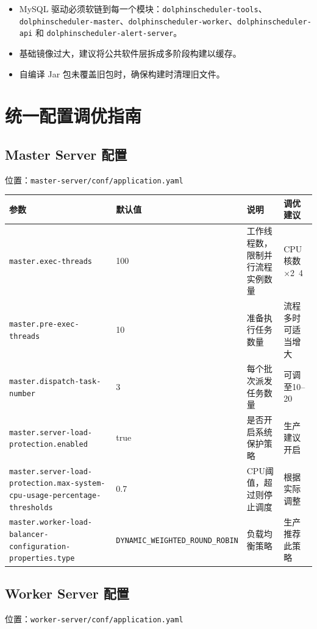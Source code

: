 \documentclass[UTF8, a4paper]{ctexbook}
\begin{document}
\begin{itemize}
	\item MySQL 驱动必须软链到每一个模块：\texttt{dolphinscheduler-tools}、\texttt{dolphinscheduler-master}、\texttt{dolphinscheduler-worker}、\texttt{dolphinscheduler-api} 和 \texttt{dolphinscheduler-alert-server}。
	\item 基础镜像过大，建议将公共软件层拆成多阶段构建以缓存。
	\item 自编译 Jar 包未覆盖旧包时，确保构建时清理旧文件。
\end{itemize}
	
\chapter{统一配置调优指南}
	
\section{Master Server 配置}
	
位置：\texttt{master-server/conf/application.yaml}
	
\begin{longtable}{p{5cm}p{3cm}p{5cm}p{3cm}}
	\toprule
	\textbf{参数} & \textbf{默认值} & \textbf{说明} & \textbf{调优建议} \\
	\midrule
	\texttt{master.exec-threads} & 100 & 工作线程数，限制并行流程实例数量 & CPU核数×2~4 \\
	\texttt{master.pre-exec-threads} & 10 & 准备执行任务数量 & 流程多时可适当增大 \\
	\texttt{master.dispatch-task-number} & 3 & 每个批次派发任务数量 & 可调至10–20 \\
	\texttt{master.server-load-protection.enabled} & true & 是否开启系统保护策略 & 生产建议开启 \\
	\texttt{master.server-load-protection.max-system-cpu-usage-percentage-thresholds} & 0.7 & CPU阈值，超过则停止调度 & 根据实际调整 \\
	\texttt{master.worker-load-balancer-configuration-properties.type} & \texttt{DYNAMIC\_WEIGHTED\_ROUND\_ROBIN} & 负载均衡策略 & 生产推荐此策略 \\
	\bottomrule
\end{longtable}
	
\section{Worker Server 配置}
	
位置：\texttt{worker-server/conf/application.yaml}
	
\end{document}
